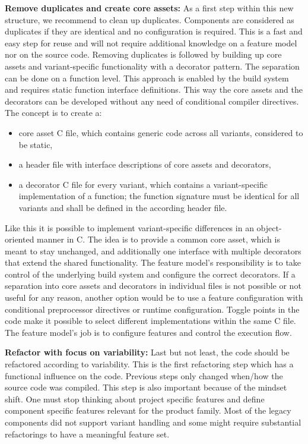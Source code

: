 \textbf{Remove duplicates and create core assets:} As a first step within this
new structure, we recommend to clean up duplicates. Components are considered as
duplicates if they are identical and no configuration is required. This is a
fast and easy step for reuse and will not require additional knowledge on a
feature model nor on the source code. Removing duplicates is followed by
building up core assets and variant-specific functionality with a decorator
pattern. The separation can be done on a function level. This approach is
enabled by the build system and requires static function interface definitions.
This way the core assets and the decorators can be developed without any need of
conditional compiler directives. The concept is to create a:
\begin{itemize}
  \item core asset C file, which contains generic code across all variants,
        considered to be static,
  \item a header file with interface descriptions of core assets and decorators,
  \item a decorator C file for every variant, which contains a variant-specific
        implementation of a function; the function signature must be identical
        for all variants and shall be defined in the according header file.
\end{itemize}
Like this it is possible to implement variant-specific differences in an
object-oriented manner in C. The idea is to provide a common core asset, which
is meant to stay unchanged, and additionally one interface with multiple
decorators that extend the shared functionality. The feature model's
responsibility is to take control of the underlying build system and configure
the correct decorators. If a separation into core assets and decorators in
individual files is not possible or not useful for any reason, another option
would be to use a feature configuration with conditional preprocessor directives
or runtime configuration. Toggle points in the code make it possible to select
different implementations within the same C file. The feature model's job is to
configure features and control the execution flow.

\textbf{Refactor with focus on variability:} Last but not least, the code should
be refactored according to variability. This is the first refactoring step which
has a functional influence on the code. Previous steps only changed when/how the
source code was compiled. This step is also important because of the mindset
shift. One must stop thinking about project specific features and define
component specific features relevant for the product family. Most of the legacy
components did not support variant handling and some might require substantial
refactorings to have a meaningful feature set.

